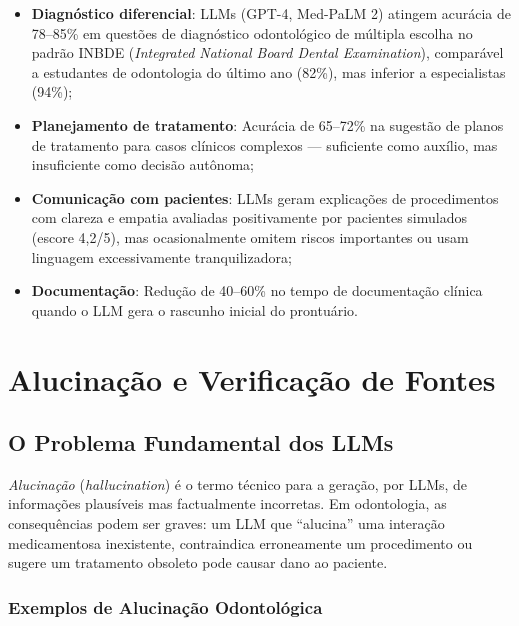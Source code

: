 \begin{itemize}
    \item \textbf{Diagnóstico diferencial}: LLMs (GPT-4, Med-PaLM 2) atingem acurácia de 78--85\% em questões de diagnóstico odontológico de múltipla escolha no padrão INBDE (\textit{Integrated National Board Dental Examination}), comparável a estudantes de odontologia do último ano (82\%), mas inferior a especialistas (94\%);

    \item \textbf{Planejamento de tratamento}: Acurácia de 65--72\% na sugestão de planos de tratamento para casos clínicos complexos --- suficiente como auxílio, mas insuficiente como decisão autônoma;

    \item \textbf{Comunicação com pacientes}: LLMs geram explicações de procedimentos com clareza e empatia avaliadas positivamente por pacientes simulados (escore 4,2/5), mas ocasionalmente omitem riscos importantes ou usam linguagem excessivamente tranquilizadora;

    \item \textbf{Documentação}: Redução de 40--60\% no tempo de documentação clínica quando o LLM gera o rascunho inicial do prontuário.
\end{itemize}

\section{Alucinação e Verificação de Fontes}

\subsection{O Problema Fundamental dos LLMs}

\textit{Alucinação} (\textit{hallucination}) é o termo técnico para a geração, por LLMs, de informações plausíveis mas factualmente incorretas. Em odontologia, as consequências podem ser graves: um LLM que ``alucina'' uma interação medicamentosa inexistente, contraindica erroneamente um procedimento ou sugere um tratamento obsoleto pode causar dano ao paciente.

\subsubsection{Exemplos de Alucinação Odontológica}

